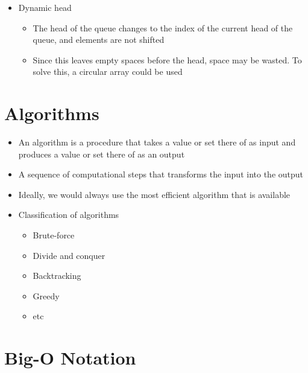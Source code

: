 \begin{itemize}
\begin{itemize}
\begin{itemize}
\begin{itemize}
      \end{itemize}
      \item Dynamic head
      \begin{itemize}
        \item The head of the queue changes to the index of the current head of the queue, and elements are not shifted
        \item Since this leaves empty spaces before the head, space may be wasted. To solve this, a circular array could be used
      \end{itemize}
    \end{itemize}
  \end{itemize}
\end{itemize}

\section*{Algorithms}

\begin{itemize}
  \item An algorithm is a procedure that takes a value or set there of as input and produces a value or set there of as an output
  \item A sequence of computational steps that transforms the input into the output
  \item Ideally, we would always use the most efficient algorithm that is available
  \item Classification of algorithms
  \begin{itemize}
    \item Brute-force
    \item Divide and conquer
    \item Backtracking
    \item Greedy
    \item etc
  \end{itemize}
\end{itemize}

\section*{Big-O Notation}

